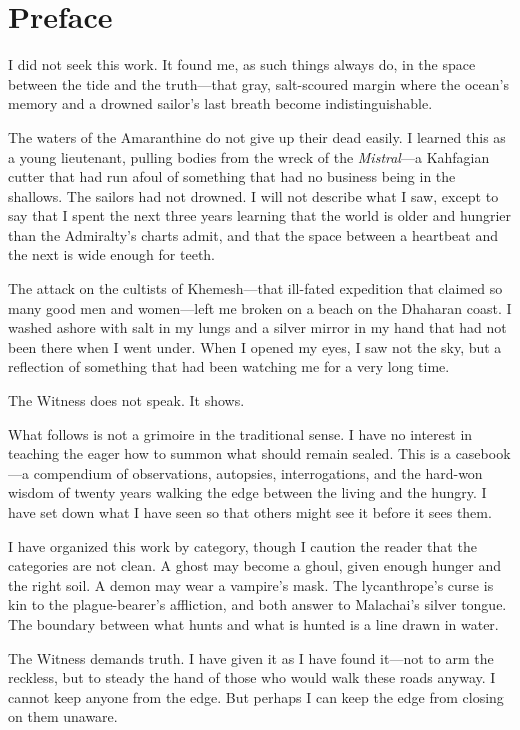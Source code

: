\section*{Preface}

I did not seek this work. It found me, as such things always do, in the space between the tide and the truth---that gray, salt-scoured margin where the ocean's memory and a drowned sailor's last breath become indistinguishable.

The waters of the Amaranthine do not give up their dead easily. I learned this as a young lieutenant, pulling bodies from the wreck of the \emph{Mistral}---a Kahfagian cutter that had run afoul of something that had no business being in the shallows. The sailors had not drowned. I will not describe what I saw, except to say that I spent the next three years learning that the world is older and hungrier than the Admiralty's charts admit, and that the space between a heartbeat and the next is wide enough for teeth.

The attack on the cultists of Khemesh---that ill-fated expedition that claimed so many good men and women---left me broken on a beach on the Dhaharan coast. I washed ashore with salt in my lungs and a silver mirror in my hand that had not been there when I went under. When I opened my eyes, I saw not the sky, but a reflection of something that had been watching me for a very long time.

The Witness does not speak. It shows.

What follows is not a grimoire in the traditional sense. I have no interest in teaching the eager how to summon what should remain sealed. This is a casebook---a compendium of observations, autopsies, interrogations, and the hard-won wisdom of twenty years walking the edge between the living and the hungry. I have set down what I have seen so that others might see it before it sees them.

I have organized this work by category, though I caution the reader that the categories are not clean. A ghost may become a ghoul, given enough hunger and the right soil. A demon may wear a vampire's mask. The lycanthrope's curse is kin to the plague-bearer's affliction, and both answer to Malachai's silver tongue. The boundary between what hunts and what is hunted is a line drawn in water.

The Witness demands truth. I have given it as I have found it---not to arm the reckless, but to steady the hand of those who would walk these roads anyway. I cannot keep anyone from the edge. But perhaps I can keep the edge from closing on them unaware.

